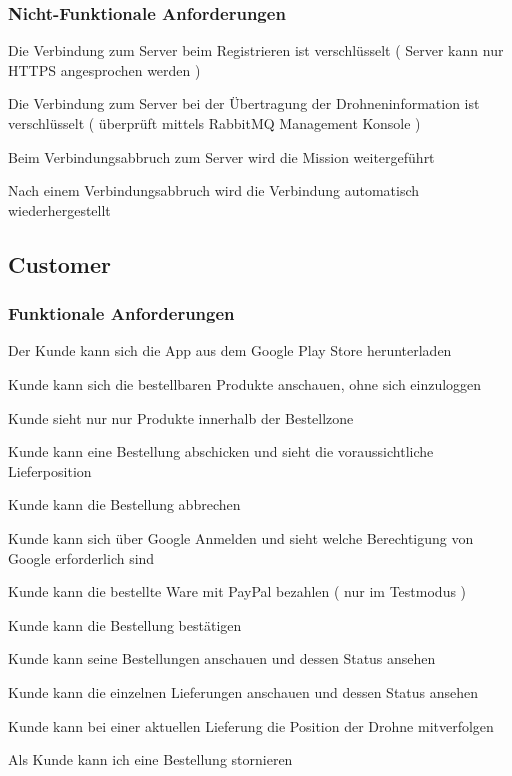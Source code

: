 \subsubsection{Nicht-Funktionale Anforderungen}
\begin{todolist}
	\item Die Verbindung zum Server beim Registrieren ist verschlüsselt ( Server kann nur HTTPS angesprochen werden )
	\item Die Verbindung zum Server bei der Übertragung der Drohneninformation ist verschlüsselt ( überprüft mittels RabbitMQ Management Konsole )
	\item[\done] Beim Verbindungsabbruch zum Server wird die Mission weitergeführt
	\item[\done] Nach einem Verbindungsabbruch wird die Verbindung automatisch wiederhergestellt
\end{todolist}

\subsection{Customer}
\subsubsection{Funktionale Anforderungen}
\begin{todolist}
	\item Der Kunde kann sich die App aus dem Google Play Store herunterladen 
	\item Kunde kann sich die bestellbaren Produkte anschauen, ohne sich einzuloggen
	\item Kunde sieht nur nur Produkte innerhalb der Bestellzone
	\item Kunde kann eine Bestellung abschicken und sieht die voraussichtliche Lieferposition
	\item Kunde kann die Bestellung abbrechen
	\item Kunde kann sich über Google Anmelden und sieht welche Berechtigung von Google erforderlich sind
	\item Kunde kann die bestellte Ware mit PayPal bezahlen ( nur im Testmodus )
	\item Kunde kann die Bestellung bestätigen
	\item Kunde kann seine Bestellungen anschauen und dessen Status ansehen
	\item Kunde kann die einzelnen Lieferungen anschauen und dessen Status ansehen
	\item Kunde kann bei einer aktuellen Lieferung die Position der Drohne mitverfolgen
	\item Als Kunde kann ich  eine Bestellung stornieren
\end{todolist}

